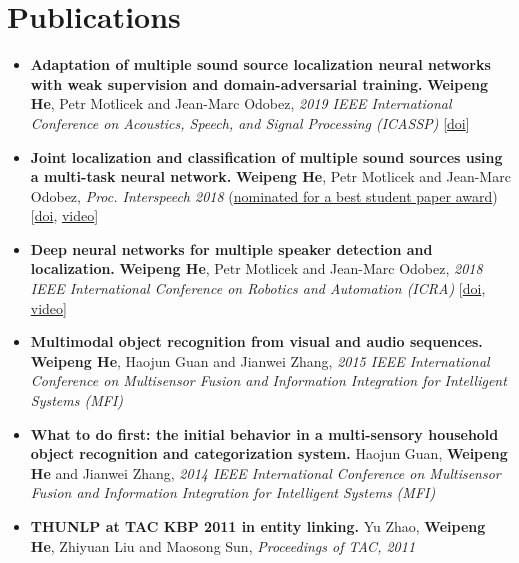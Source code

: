 \documentclass[a4paper,10pt]{article} %
\begin{document}
\section{Publications}
\begin{itemize}
  \item \textbf{Adaptation of multiple sound source localization neural networks with weak supervision and domain-adversarial training.}
    \textbf{Weipeng He}, Petr Motlicek and Jean-Marc Odobez,
    \textit{2019 IEEE International Conference on Acoustics, Speech, and Signal Processing (ICASSP)}
    [\href{https://doi.org/10.1109/ICASSP.2019.8682655}{doi}]

  \item \textbf{Joint localization and classification of multiple sound sources using a multi-task neural network.}
    \textbf{Weipeng He}, Petr Motlicek and Jean-Marc Odobez,
    \textit{Proc. Interspeech 2018}
    (\ul{nominated for a best student paper award})
    [\href{http://doi.org/10.21437/Interspeech.2018-1269}{doi}, \href{https://www.youtube.com/watch?v=O7bQvg03RTc}{video}]

  \item \textbf{Deep neural networks for multiple speaker detection and localization.}
    \textbf{Weipeng He}, Petr Motlicek and Jean-Marc Odobez,
    \textit{2018 IEEE International Conference on Robotics and Automation (ICRA)}
    [\href{http://doi.org/10.1109/ICRA.2018.8461267}{doi}, \href{https://www.youtube.com/watch?v=_4EwuVlE_pU}{video}]

  \item \textbf{Multimodal object recognition from visual and audio sequences.}
    \textbf{Weipeng He}, Haojun Guan and Jianwei Zhang,
    \textit{2015 IEEE International Conference on Multisensor Fusion and Information Integration for Intelligent Systems (MFI)}

  \item \textbf{What to do first: the initial behavior in a multi-sensory household object recognition and categorization system.}
    Haojun Guan, \textbf{Weipeng He} and Jianwei Zhang,
    \textit{2014 IEEE International Conference on Multisensor Fusion and Information Integration for Intelligent Systems (MFI)}

  \item \textbf{THUNLP at TAC KBP 2011 in entity linking.}
    Yu Zhao, \textbf{Weipeng He}, Zhiyuan Liu and Maosong Sun,
    \textit{Proceedings of TAC, 2011}
\end{itemize}
\end{document}
